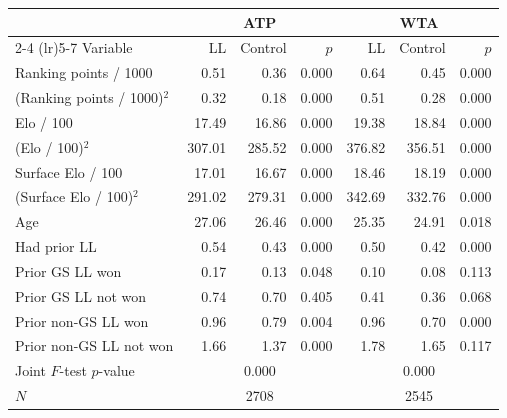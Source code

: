 \begin{tabular}{l rrr rrr}
\toprule
 & \multicolumn{3}{c}{ATP} & \multicolumn{3}{c}{WTA} \\
\cmidrule(lr){2-4} \cmidrule(lr){5-7}
Variable & LL & Control & $p$ & LL & Control & $p$ \\
\midrule
Ranking points / 1000 & 0.51 & 0.36 & 0.000 & 0.64 & 0.45 & 0.000 \\
(Ranking points / 1000)$^2$ & 0.32 & 0.18 & 0.000 & 0.51 & 0.28 & 0.000 \\
Elo / 100 & 17.49 & 16.86 & 0.000 & 19.38 & 18.84 & 0.000 \\
(Elo / 100)$^2$ & 307.01 & 285.52 & 0.000 & 376.82 & 356.51 & 0.000 \\
Surface Elo / 100 & 17.01 & 16.67 & 0.000 & 18.46 & 18.19 & 0.000 \\
(Surface Elo / 100)$^2$ & 291.02 & 279.31 & 0.000 & 342.69 & 332.76 & 0.000 \\
Age & 27.06 & 26.46 & 0.000 & 25.35 & 24.91 & 0.018 \\
Had prior LL & 0.54 & 0.43 & 0.000 & 0.50 & 0.42 & 0.000 \\
Prior GS LL won & 0.17 & 0.13 & 0.048 & 0.10 & 0.08 & 0.113 \\
Prior GS LL not won & 0.74 & 0.70 & 0.405 & 0.41 & 0.36 & 0.068 \\
Prior non-GS LL won & 0.96 & 0.79 & 0.004 & 0.96 & 0.70 & 0.000 \\
Prior non-GS LL not won & 1.66 & 1.37 & 0.000 & 1.78 & 1.65 & 0.117 \\
\midrule
Joint $F$-test $p$-value & \multicolumn{3}{c}{0.000} & \multicolumn{3}{c}{0.000} \\
$N$ & \multicolumn{3}{c}{2708} & \multicolumn{3}{c}{2545} \\
\bottomrule
\end{tabular}
